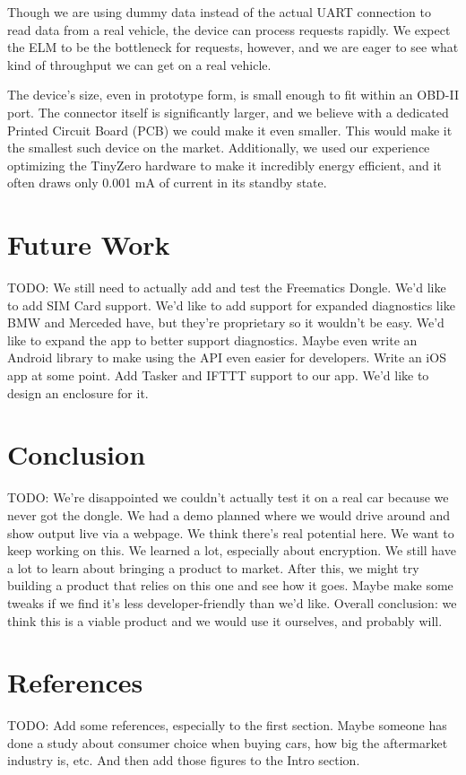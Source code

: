 \documentclass[10pt,letterpaper,unboxed,cm]{article}
\newcommand{\todo}{\color{red} TODO: \color{black}}
\begin{document}
Though we are using dummy data instead of the actual UART connection to read data from a real vehicle, the device can process requests rapidly. We expect the ELM to be the bottleneck for requests, however, and we are eager to see what kind of throughput we can get on a real vehicle.

The device's size, even in prototype form, is small enough to fit within an OBD-II port. The connector itself is significantly larger, and we believe with a dedicated Printed Circuit Board (PCB) we could make it even smaller. This would make it the smallest such device on the market. Additionally, we used our experience optimizing the TinyZero hardware to make it incredibly energy efficient, and it often draws only 0.001 mA of current in its standby state.

\section{Future Work}

\todo We still need to actually add and test the Freematics Dongle. We'd like to add SIM Card support. We'd like to add support for expanded diagnostics like BMW and Merceded have, but they're proprietary so it wouldn't be easy. We'd like to expand the app to better support diagnostics. Maybe even write an Android library to make using the API even easier for developers. Write an iOS app at some point. Add Tasker and IFTTT support to our app. We'd like to design an enclosure for it.

\section{Conclusion}

\todo We're disappointed we couldn't actually test it on a real car because we never got the dongle. We had a demo planned where we would drive around and show output live via a webpage. We think there's real potential here. We want to keep working on this. We learned a lot, especially about encryption. We still have a lot to learn about bringing a product to market. After this, we might try building a product that relies on this one and see how it goes. Maybe make some tweaks if we find it's less developer-friendly than we'd like. Overall conclusion: we think this is a viable product and we would use it ourselves, and probably will.

\section{References}

\todo Add some references, especially to the first section. Maybe someone has done a study about consumer choice when buying cars, how big the aftermarket industry is, etc. And then add those figures to the Intro section.

\end{document}

